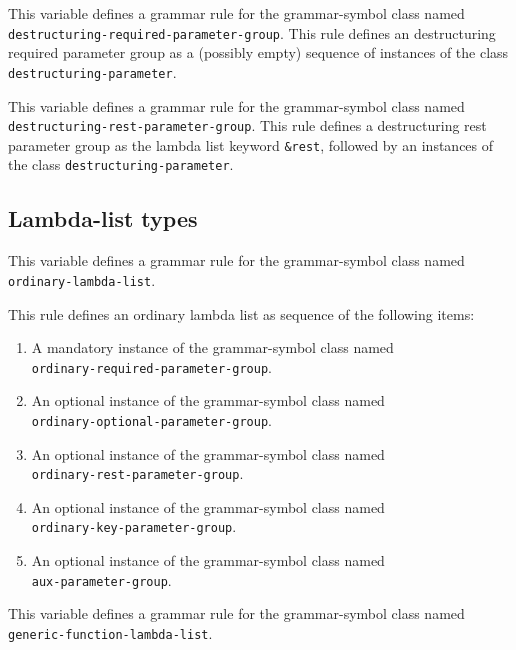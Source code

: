 
This variable defines a grammar rule for the grammar-symbol class
named \texttt{destructuring-required-parameter-group}.  This rule
defines an destructuring required parameter group as a (possibly
empty) sequence of instances of the class
\texttt{destructuring-parameter}.


This variable defines a grammar rule for the grammar-symbol class
named \texttt{destructuring-rest-parameter-group}.  This rule defines
a destructuring rest parameter group as the lambda list keyword
\texttt{\&rest}, followed by an instances of the class
\texttt{destructuring-parameter}.

\subsection{Lambda-list types}


This variable defines a grammar rule for the grammar-symbol class
named \texttt{ordinary-lambda-list}.

This rule defines an ordinary lambda list as sequence of the following
items:

\begin{enumerate}
\item A mandatory instance of the grammar-symbol class named\\
  \texttt{ordinary-required-parameter-group}.
\item An optional instance of the grammar-symbol class named\\
  \texttt{ordinary-optional-parameter-group}.
\item An optional instance of the grammar-symbol class named\\
\texttt{ordinary-rest-parameter-group}.
\item An optional instance of the grammar-symbol class named\\
\texttt{ordinary-key-parameter-group}.
\item An optional instance of the grammar-symbol class named\\
\texttt{aux-parameter-group}.
\end{enumerate}


This variable defines a grammar rule for the grammar-symbol class
named \texttt{generic-function-lambda-list}.

